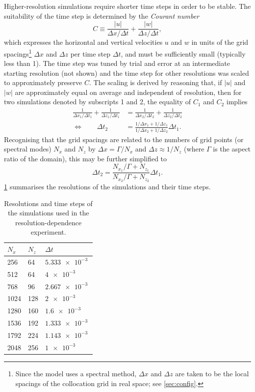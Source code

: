 \documentclass[../main.tex]{subfiles}
\begin{document}
Higher-resolution simulations require shorter time steps in order to be stable.
The suitability of the time step is determined by the \emph{Courant number}
\parencite{pope2000}
\[
    C \equiv \frac{|u|}{\Delta x / \Delta t} + \frac{|w|}{\Delta z / \Delta t},
\]
which expresses the horizontal and vertical velocities $u$ and $w$ in units of
the grid spacings\footnote{Since the model uses a spectral method, $\Delta x$
and $\Delta z$ are taken to be the local spacings of the collocation grid in
real space; see \cref{sec:config}.} $\Delta x$ and $\Delta z$ per time step
$\Delta t$, and must be sufficiently small (typically less than 1). The time
step was tuned by trial and error at an intermediate starting resolution (not
shown) and the time step for other resolutions was scaled to approximately
preserve $C$. The scaling is derived by reasoning that, if $|u|$ and $|w|$ are
approximately equal on average and independent of resolution, then for two
simulations denoted by subscripts 1 and 2, the equality of $C_1$ and $C_2$
implies
\begin{align*}
    \frac{1}{\Delta x_1 / \Delta t_1} + \frac{1}{\Delta z_1 / \Delta t_1}
        &= \frac{1}{\Delta x_2 / \Delta t_2}
            + \frac{1}{\Delta z_2 / \Delta t_2} \\
    \Leftrightarrow \qquad
    \Delta t_2
        &= \frac{1/\Delta x_1 + 1/\Delta z_1}{1/\Delta x_2 + 1/\Delta z_2}
            \Delta t_1.
\end{align*}
Recognising that the grid spacings are related to the numbers
of grid points (or spectral modes) $N_x$ and $N_z$ by $\Delta x = \Gamma/N_x$
and $\Delta z \approx 1/N_z$ (where $\Gamma$ is the aspect ratio of the
domain), this may be further simplified to
\[
    \Delta t_2
        = \frac{N_{x_1}/\Gamma + N_{z_1}}{N_{x_2}/\Gamma + N_{z_2}} \Delta t_1.
\]
\cref{tab:resolution_tests} summarises the resolutions of the simulations
and their time steps.

\begin{table}[ht]
\centering
\begin{tabular}{l l l}
    \toprule
    $N_x$ & $N_z$ & $\Delta t$ \\
    \midrule
    256 & 64 & $\SI{5.333e-3}{}$ \\
    512 & 64 & $\SI{4e-3}{}$ \\
    768 & 96 & $\SI{2.667e-3}{}$ \\
    1024 & 128 & $\SI{2e-3}{}$ \\
    1280 & 160 & $\SI{1.6e-3}{}$ \\
    1536 & 192 & $\SI{1.333e-3}{}$ \\
    1792 & 224 & $\SI{1.143e-3}{}$ \\
    2048 & 256 & $\SI{1e-3}{}$ \\
    \bottomrule
\end{tabular}
\caption{
    Resolutions and time steps of the simulations used in the
    resolution-dependence experiment.
}
\label{tab:resolution_tests}
\end{table}
\end{document}
